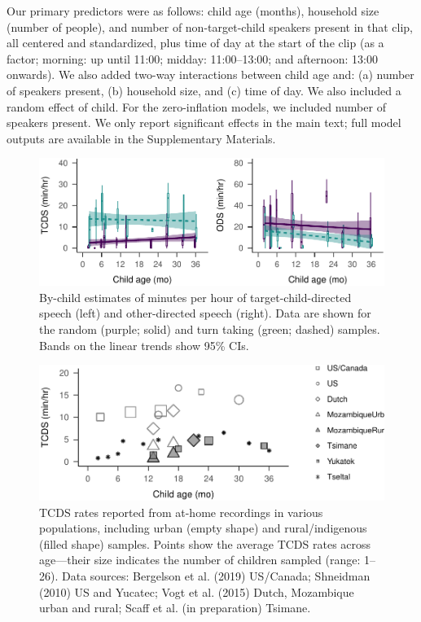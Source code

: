 \documentclass[floatsintext,man]{apa6}
\theoremstyle{definition}
\theoremstyle{definition}
\theoremstyle{definition}
\theoremstyle{remark}
\begin{document}
Our primary predictors were as follows: child age (months), household
size (number of people), and number of non-target-child speakers present
in that clip, all centered and standardized, plus time of day at the
start of the clip (as a factor; morning: up until 11:00; midday:
11:00--13:00; and afternoon: 13:00 onwards). We also added two-way
interactions between child age and: (a) number of speakers present, (b)
household size, and (c) time of day. We also included a random effect of
child. For the zero-inflation models, we included number of speakers
present. We only report significant effects in the main text; full model
outputs are available in the Supplementary Materials.

\begin{figure}
\centering
\includegraphics{Tseltal-CLE_files/figure-latex/fig3-1.pdf}
\caption{\label{fig:fig3}By-child estimates of minutes per hour of
target-child-directed speech (left) and other-directed speech (right).
Data are shown for the random (purple; solid) and turn taking (green;
dashed) samples. Bands on the linear trends show 95\% CIs.}
\end{figure}

\begin{figure}
\centering
\includegraphics{Tseltal-CLE_files/figure-latex/fig4-1.pdf}
\caption{\label{fig:fig4}TCDS rates reported from at-home recordings in
various populations, including urban (empty shape) and rural/indigenous
(filled shape) samples. Points show the average TCDS rates across
age---their size indicates the number of children sampled (range:
1--26). Data sources: Bergelson et al. (2019) US/Canada; Shneidman
(2010) US and Yucatec; Vogt et al. (2015) Dutch, Mozambique urban and
rural; Scaff et al. (in preparation) Tsimane.}
\end{figure}
\end{document}
